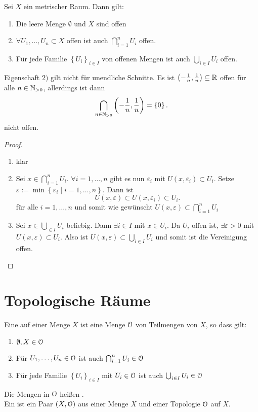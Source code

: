 \begin{theorem}
    Sei $X$ ein metrischer Raum. Dann gilt:
    \begin{enumerate}[1)]
        \item Die leere Menge $\emptyset$ und $X$ sind offen
        \item  $\forall U_1,\ldots,U_n\subset X$ offen ist auch $\bigcap_{i=1}^n U_i$ offen.
        \item Für jede Familie $\left \{U_i\right\} _{i\in I}$ von offenen Mengen ist auch $\bigcup_{i\in I} U_i$ offen.
    \end{enumerate}
\end{theorem}

\warning
    Eigenschaft $2)$ gilt nicht für unendliche Schnitte. Es ist $\left( -\frac{1}{n},\frac{1}{n} \right) \subseteq \mathbb{R}$ offen für alle $n\in \mathbb{N}_{>0}$, allerdings ist dann
    \[
        \bigcap_{n\in \mathbb{N}_{>0}} \left( -\frac{1}{n},\frac{1}{n} \right)  = \left \{0\right\} 
    .\] 
    nicht offen.
\begin{proof}
    \begin{enumerate}[1)]
        \item klar
        \item Sei $x\in \bigcap_{i=1}^n U_i$. $\forall i = 1,\ldots,n$ gibt es nun $ε_i$ mit  $U(x,ε_i)\subset U_i$. Setze $ε := \min \left \{ε_i \mid  i=1,\ldots,n\right\}$. Dann ist
            \[
                U(x,ε) \subset U(x,ε_i) \subset U_i
            .\] 
            für alle $i=1,\ldots,n$ und somit wie gewünscht $U(x,ε) \subset \bigcap_{i=1}^n U_i$
        \item Sei $x\in \bigcup_{\in I} U_i$ beliebig. Dann $\exists i\in I$ mit $x\in U_i$. Da $U_i$ offen ist,  $\exists ε>0$ mit $U(x,ε) \subset U_i$. Also ist $U(x,ε) \subset  \bigcup_{i\in I} U_i$ und somit ist die Vereinigung offen.
    \end{enumerate}
\end{proof}

\section{Topologische Räume} 
    
\begin{definition}
    Eine  auf einer Menge $X$ ist eine Menge  $\mathcal{O}$ von Teilmengen von  $X$, so dass gilt:
    \begin{enumerate}[1)]
        \item $\emptyset,X \in \mathcal{O}$
        \item Für $U_1,\ldots,U_n \in \mathcal{O}$ ist auch $\bigcap_{i=1}^n U_i \in  \mathcal{O}$
        \item Für jede Familie $\left \{U_i\right\} _{i\in I}$ mit $U_i \in \mathcal{O}$ ist auch $\bigcup_{i\in I} U_i \in  \mathcal{O}$
    \end{enumerate}
    Die Mengen in $\mathcal{O}$ heißen . \\
    Ein  ist ein Paar  $(X,\mathcal{O})$ aus einer Menge  $X$ und einer Topologie  $\mathcal{O}$ auf  $X$.
\end{definition}


